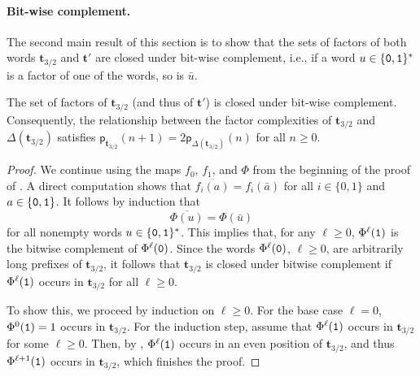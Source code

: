 \documentclass[12pt,reqno]{article}
\newcommand{\cA}{\{{\tt 0},{\tt 1}\}}
\begin{document}

\paragraph{Bit-wise complement.} The second main result of this section is to show that the sets of factors of both words $\mathbf{t}_{3/2}$ and $\mathbf{t}'$ are closed under bit-wise complement,  i.e.,  if a word $u\in\cA^*$ is a factor of one of the words,  so is $\bar{u}$.


\begin{proposition}\label{pro:close_bw}
  The set of factors of $\mathbf{t}_{3/2}$ (and thus of $\mathbf{t}'$) is closed under bit-wise complement. 
  Consequently,  the relationship between the factor complexities of $\mathbf{t}_{3/2}$ and $\Delta(\mathbf{t}_{3/2})$ satisfies $\mathsf{p}_{\mathbf{t}_{3/2}}(n+1)= 2 \mathsf{p}_{\Delta(\mathbf{t}_{3/2})}(n)$ for all $n\ge 0$.
\end{proposition}

\begin{proof}
We continue using the maps $f_0$, $f_1$, and $\Phi$ from the beginning of the proof of .
A direct computation shows that
$\overline{f_i(a)} = f_i(\bar{a})$ for all $i \in \{0,1\}$ and $a \in \cA$.
It follows by induction that
\begin{equation*}
    \overline{\Phi(u)} = \Phi(\bar{u})
\end{equation*}
for all nonempty words $u \in \{{\tt 0},{\tt 1}\}^*$.
This implies that, for any $\ell \ge 0$, $\Phi^\ell({\tt 1})$ is the bitwise complement of $\Phi^\ell({\tt 0})$.
Since the words $\Phi^\ell({\tt 0})$, $\ell \ge 0$, are arbitrarily long prefixes of $\mathbf{t}_{3/2}$, it follows that $\mathbf{t}_{3/2}$ is closed under bitwise complement if $\Phi^\ell({\tt 1})$ occurs in $\mathbf{t}_{3/2}$ for all $\ell \ge 0$.

To show this,  we proceed by induction on $\ell\ge 0$.
For the base case $\ell = 0$,  $\Phi^0({\tt 1}) = {\rm 1}$ occurs in $\mathbf{t}_{3/2}$.
For the induction step,  assume that $\Phi^\ell({\tt 1})$ occurs in $\mathbf{t}_{3/2}$ for some $\ell \ge 0$.
Then, by , $\Phi^\ell({\tt 1})$ occurs in an even position of $\mathbf{t}_{3/2}$, and thus $\Phi^{\ell+1}({\tt 1})$ occurs in $\mathbf{t}_{3/2}$,  which finishes the proof.
\end{proof}
\end{document}
